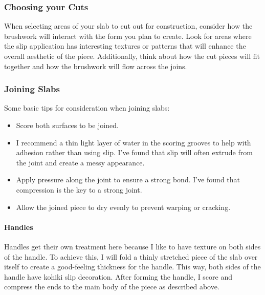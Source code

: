 \documentclass[12pt]{scrartcl}
\begin{document}
\subsubsection*{Choosing your Cuts}
When selecting areas of your slab to cut out for construction, consider how the brushwork will interact with the form you plan to create. Look for areas where the slip application has interesting textures or patterns that will enhance the overall aesthetic of the piece.  Additionally, think about how the cut pieces will fit together and how the brushwork will flow across the joins.

\subsubsection*{Joining Slabs}
Some basic tips for consideration when joining slabs:
\begin{itemize}
  \item Score both surfaces to be joined.
  \item I recommend a thin light layer of water in the scoring grooves to help with adhesion rather than using slip.  I've found that slip will often extrude from the joint and create a messy appearance.
  \item Apply pressure along the joint to ensure a strong bond. I've found that compression is the key to a strong joint.
  \item Allow the joined piece to dry evenly to prevent warping or cracking.
\end{itemize}

\paragraph{Handles}
Handles get their own treatment here because I like to have texture on both sides of the handle.  To achieve this, I will fold a thinly stretched piece of the slab over itself to create a  good-feeling thickness for the handle.  This way, both sides of the handle have kohiki slip decoration.  After forming the handle, I score and compress the ends to the main body of the piece as described above.
\end{document}
